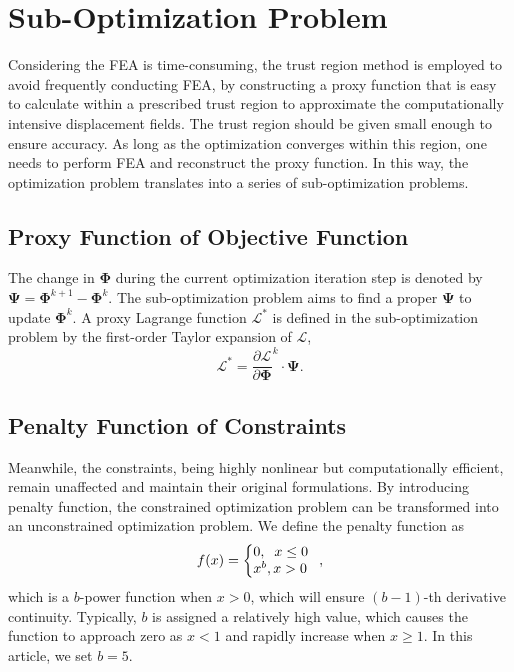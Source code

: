 \documentclass[journal]{IEEEtran}
\renewcommand{\vec}[1]{\mathbf{#1}}
\theoremstyle{definition}
\renewcommand{\vec}[1]{\mathbf{#1}}
\begin{document}
\section{Sub-Optimization Problem}
Considering the FEA is time-consuming, the trust region method is employed to avoid frequently conducting FEA, by constructing a proxy function that is easy to calculate within a prescribed trust region to approximate the computationally intensive displacement fields. The trust region should be given small enough to ensure accuracy. As long as the optimization converges within this region, one needs to perform FEA and reconstruct the proxy function. In this way, the optimization problem translates into a series of sub-optimization problems.

\subsection{Proxy Function of Objective Function}
The change in $\vec{\Phi}$ during the current optimization iteration step is denoted by $\vec{\Psi} = \vec{\Phi}^{k+1} - \vec{\Phi}^k$. The sub-optimization problem aims to find a proper $\vec{\Psi}$ to update $\vec{\Phi}^k$. A proxy Lagrange function $\mathcal{L}^*$ is defined in the sub-optimization problem by the first-order Taylor expansion of $\mathcal{L}$,
\begin{equation}
  \mathcal{L}^* = \frac{\partial \mathcal{L}}{\partial \vec{\Phi}}^k \cdot \vec{\Psi}.
\end{equation}

\subsection{Penalty Function of Constraints}
Meanwhile, the constraints, being highly nonlinear but computationally efficient, remain unaffected and maintain their original formulations. By introducing penalty function, the constrained optimization problem can be transformed into an unconstrained optimization problem. We define the penalty function as
\begin{equation}
  \label{Barrier_function}
  f(x)=\left\{
  \begin{array}{@{}l@{}l}
     & 0, \; \; x\leq0 \\
     & x^b, x>0
  \end{array}
  \right.
  ,
\end{equation}
which is a $b$-power function when $x>0$, which will ensure $(b-1)$-th derivative continuity. Typically, $b$ is assigned a relatively high value, which causes the function to approach zero as $x<1$ and rapidly increase when $x\geq 1$. In this article, we set $b=5$. %
\end{document}
